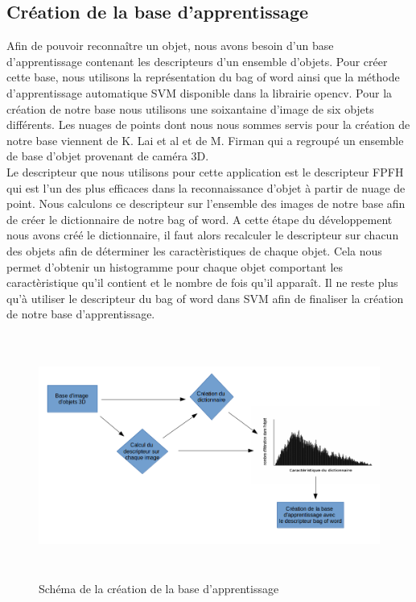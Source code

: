 \subsection{Création de la base d'apprentissage}
Afin de pouvoir reconnaître un objet, nous avons besoin d'un base d'apprentissage contenant les descripteurs d'un ensemble
d'objets. Pour créer cette base, nous utilisons la représentation du \og bag of word \fg ainsi que la méthode d'apprentissage 
automatique SVM\cite{SVM} disponible dans la librairie opencv. Pour la création de notre base nous utilisons une soixantaine
d'image de six objets différents. Les nuages de points dont nous nous sommes servis pour la création de notre base viennent de 
K. Lai et al\cite{Base1} et de M. Firman\cite{generalBase} qui a regroupé un ensemble de base d'objet provenant de caméra 3D.\\

Le descripteur que nous utilisons pour cette application est le descripteur FPFH\cite{FPFH} qui est l'un des plus efficaces dans la
reconnaissance d'objet à partir de nuage de point. Nous calculons ce descripteur sur l'ensemble des images de notre base afin de
créer le dictionnaire de notre bag of word. A cette étape du développement nous avons créé le dictionnaire, il faut alors recalculer
le descripteur sur chacun des objets afin de déterminer les caractèristiques de chaque objet. Cela nous permet d'obtenir un histogramme
pour chaque objet comportant les caractèristique qu'il contient et le nombre de fois qu'il apparaît. Il ne reste plus qu'à utiliser
le descripteur du bag of word dans SVM afin de finaliser la création de notre base d'apprentissage.

\begin{figure}[!ht]
  \begin{center}
    \includegraphics[height=8cm]{image/schemaBase.png}
    \caption{Schéma de la création de la base d'apprentissage}
  \end{center}
\end{figure}


